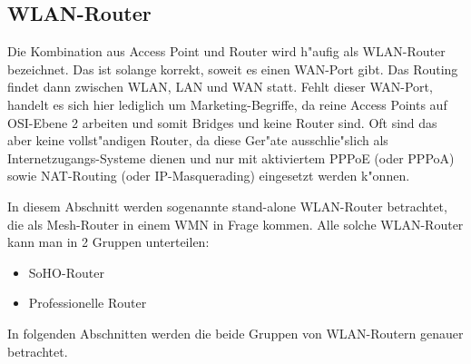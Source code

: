 \newpage

\subsection{WLAN-Router}

Die Kombination aus Access Point und Router wird h"aufig als WLAN-Router
bezeichnet. Das ist solange korrekt, soweit es einen WAN-Port gibt. Das
Routing findet dann zwischen WLAN, LAN und WAN statt. Fehlt dieser
WAN-Port, handelt es sich hier lediglich um Marketing-Begriffe, da reine
Access Points auf OSI-Ebene 2 arbeiten und somit Bridges und keine
Router sind. Oft sind das aber keine vollst"andigen Router, da diese
Ger"ate ausschlie"slich als Internetzugangs-Systeme dienen und nur mit
aktiviertem PPPoE (oder PPPoA) sowie NAT-Routing (oder IP-Masquerading)
eingesetzt werden k"onnen.

In diesem Abschnitt werden sogenannte stand-alone WLAN-Router
betrachtet, die als Mesh-Router in einem WMN in Frage kommen.
Alle solche WLAN-Router kann man in 2 Gruppen unterteilen:

\begin{itemize}
\item SoHO-Router
\item Professionelle Router
\end{itemize}

In folgenden Abschnitten werden die beide Gruppen von WLAN-Routern genauer
betrachtet.



